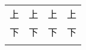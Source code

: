 \documentclass[nofonts]{ctexart}
\begin{document}
\setlength\dashlinedash{1pt}
\setlength\dashlinegap{2pt}
\begin{tabular}{:cc:cc:}
	\hdashline
	上	& 上	& 上	& 上	\\
	下	& 下	& 下	& 下	\\
	\hdashline
\end{tabular}
\end{document}
